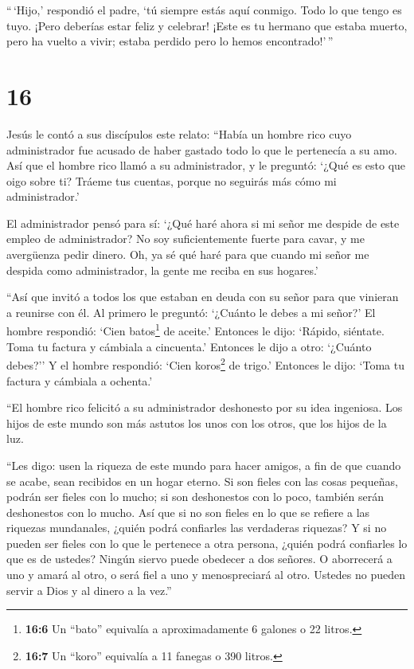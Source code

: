  ``\,`Hijo,' respondió el padre, `tú siempre estás aquí
conmigo. Todo lo que tengo es tuyo.  ¡Pero deberías estar
feliz y celebrar! ¡Este es tu hermano que estaba muerto, pero ha vuelto
a vivir; estaba perdido pero lo hemos encontrado!'\,''

\hypertarget{section-15}{%
\section{16}\label{section-15}}

 Jesús le contó a sus discípulos este relato: ``Había un
hombre rico cuyo administrador fue acusado de haber gastado todo lo que
le pertenecía a su amo.  Así que el hombre rico llamó a su
administrador, y le preguntó: `¿Qué es esto que oigo sobre ti? Tráeme
tus cuentas, porque no seguirás más cómo mi administrador.'

 El administrador pensó para sí: `¿Qué haré ahora si mi
señor me despide de este empleo de administrador? No soy suficientemente
fuerte para cavar, y me avergüenza pedir dinero.  Oh, ya sé
qué haré para que cuando mi señor me despida como administrador, la
gente me reciba en sus hogares.'

 ``Así que invitó a todos los que estaban en deuda con su
señor para que vinieran a reunirse con él. Al primero le preguntó:
`¿Cuánto le debes a mi señor?'  El hombre respondió: `Cien
batos\footnote{\textbf{16:6} Un ``bato'' equivalía a aproximadamente 6
  galones o 22 litros.} de aceite.' Entonces le dijo: `Rápido, siéntate.
Toma tu factura y cámbiala a cincuenta.'  Entonces le dijo a
otro: `¿Cuánto debes?'' Y el hombre respondió: `Cien koros\footnote{\textbf{16:7}
  Un ``koro'' equivalía a 11 fanegas o 390 litros.} de trigo.' Entonces
le dijo: `Toma tu factura y cámbiala a ochenta.'

 ``El hombre rico felicitó a su administrador deshonesto por
su idea ingeniosa. Los hijos de este mundo son más astutos los unos con
los otros, que los hijos de la luz.

 ``Les digo: usen la riqueza de este mundo para hacer
amigos, a fin de que cuando se acabe, sean recibidos en un hogar eterno.
 Si son fieles con las cosas pequeñas, podrán ser fieles
con lo mucho; si son deshonestos con lo poco, también serán deshonestos
con lo mucho.  Así que si no son fieles en lo que se
refiere a las riquezas mundanales, ¿quién podrá confiarles las
verdaderas riquezas?  Y si no pueden ser fieles con lo que
le pertenece a otra persona, ¿quién podrá confiarles lo que es de
ustedes?  Ningún siervo puede obedecer a dos señores. O
aborrecerá a uno y amará al otro, o será fiel a uno y menospreciará al
otro. Ustedes no pueden servir a Dios y al dinero a la vez.''

